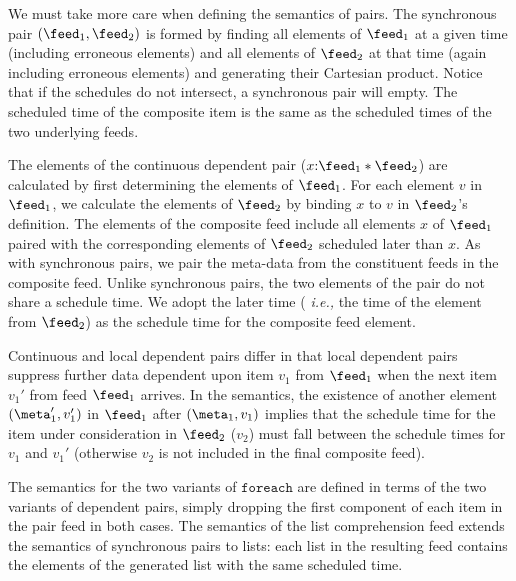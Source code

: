 We must take more care when defining the semantics of pairs.  The
synchronous pair $(\feed_1,\feed_2)$ is formed by finding all elements
of $\feed_1$ at a given time (including erroneous elements) and all
elements of $\feed_2$ at that time (again including erroneous
elements) and generating their Cartesian product.  Notice that if
the schedules do not intersect, a synchronous pair will empty.
The scheduled time of the composite item is the same as the scheduled
times of the two underlying feeds. 

The elements of the continuous dependent pair ($x{:}\feed_1 *
\feed_2$) are calculated by first determining the elements of
$\feed_1$.  For each element $v$ in $\feed_1$, we calculate the
elements of $\feed_2$ by binding $x$ to $v$ in $\feed_2$'s definition.
The elements of the composite feed include all elements $x$ of
$\feed_1$ paired with the corresponding elements of $\feed_2$
scheduled later than $x$.  As with synchronous pairs, we pair the
meta-data from the constituent feeds in the composite feed. Unlike 
synchronous pairs, the two elements of the pair
do not share a schedule time.  We adopt the later time ({\em
  i.e.,} the time of the element from $\feed_2$) as the schedule time
for the composite feed element.

Continuous and local dependent pairs differ in that local dependent
pairs suppress further data dependent upon item $v_1$ from $\feed_1$
when the next item $v_1'$ from feed $\feed_1$ arrives.  In the
semantics, the existence of another element $(\meta_1',v_1')$
in $\feed_1$ after $(\meta_1,v_1)$ implies that the 
schedule time for the item under consideration in $\feed_2$ ($v_2$) 
must fall between the schedule times for $v_1$ and $v_1'$
(otherwise $v_2$ is not included in the final composite feed). 

The semantics for the two variants of $\mathtt{foreach}$ are defined
in terms of the two variants of dependent pairs, simply dropping the
first component of each item in the pair feed in both cases.  The semantics
of the list comprehension feed extends the semantics of synchronous
pairs to lists: each list in the resulting feed contains the elements
of the generated list with the same scheduled time.

